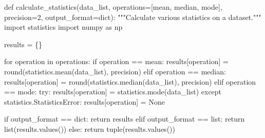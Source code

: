 \documentclass[
  letterpaper,
  DIV=11,
  numbers=noendperiod,
  oneside]{scrreprt}
\newenvironment{Shaded}{}{}
\newcommand{\BuiltInTok}[1]{\textcolor[rgb]{0.84,0.23,0.29}{#1}}
\newcommand{\CommentTok}[1]{\textcolor[rgb]{0.42,0.45,0.49}{#1}}
\newcommand{\ControlFlowTok}[1]{\textcolor[rgb]{0.84,0.23,0.29}{#1}}
\newcommand{\DecValTok}[1]{\textcolor[rgb]{0.00,0.36,0.77}{#1}}
\newcommand{\ImportTok}[1]{\textcolor[rgb]{0.01,0.18,0.38}{#1}}
\newcommand{\KeywordTok}[1]{\textcolor[rgb]{0.84,0.23,0.29}{#1}}
\newcommand{\NormalTok}[1]{\textcolor[rgb]{0.14,0.16,0.18}{#1}}
\newcommand{\OperatorTok}[1]{\textcolor[rgb]{0.14,0.16,0.18}{#1}}
\newcommand{\StringTok}[1]{\textcolor[rgb]{0.01,0.18,0.38}{#1}}
\newcommand{\VariableTok}[1]{\textcolor[rgb]{0.89,0.38,0.04}{#1}}
\begin{document}
\begin{Shaded}
\begin{Highlighting}[]
\KeywordTok{def}\NormalTok{ calculate\_statistics(data\_list, operations}\OperatorTok{=}\NormalTok{[}\StringTok{\textquotesingle{}mean\textquotesingle{}}\NormalTok{, }\StringTok{\textquotesingle{}median\textquotesingle{}}\NormalTok{, }\StringTok{\textquotesingle{}mode\textquotesingle{}}\NormalTok{], }
\NormalTok{                        precision}\OperatorTok{=}\DecValTok{2}\NormalTok{, output\_format}\OperatorTok{=}\StringTok{\textquotesingle{}dict\textquotesingle{}}\NormalTok{):}
    \CommentTok{"""Calculate various statistics on a dataset."""}
    \ImportTok{import}\NormalTok{ statistics}
    \ImportTok{import}\NormalTok{ numpy }\ImportTok{as}\NormalTok{ np}
    
\NormalTok{    results }\OperatorTok{=}\NormalTok{ \{\}}
    
    \ControlFlowTok{for}\NormalTok{ operation }\KeywordTok{in}\NormalTok{ operations:}
        \ControlFlowTok{if}\NormalTok{ operation }\OperatorTok{==} \StringTok{\textquotesingle{}mean\textquotesingle{}}\NormalTok{:}
\NormalTok{            results[operation] }\OperatorTok{=} \BuiltInTok{round}\NormalTok{(statistics.mean(data\_list), precision)}
        \ControlFlowTok{elif}\NormalTok{ operation }\OperatorTok{==} \StringTok{\textquotesingle{}median\textquotesingle{}}\NormalTok{:}
\NormalTok{            results[operation] }\OperatorTok{=} \BuiltInTok{round}\NormalTok{(statistics.median(data\_list), precision)}
        \ControlFlowTok{elif}\NormalTok{ operation }\OperatorTok{==} \StringTok{\textquotesingle{}mode\textquotesingle{}}\NormalTok{:}
            \ControlFlowTok{try}\NormalTok{:}
\NormalTok{                results[operation] }\OperatorTok{=}\NormalTok{ statistics.mode(data\_list)}
            \ControlFlowTok{except}\NormalTok{ statistics.StatisticsError:}
\NormalTok{                results[operation] }\OperatorTok{=} \VariableTok{None}
    
    \ControlFlowTok{if}\NormalTok{ output\_format }\OperatorTok{==} \StringTok{\textquotesingle{}dict\textquotesingle{}}\NormalTok{:}
        \ControlFlowTok{return}\NormalTok{ results}
    \ControlFlowTok{elif}\NormalTok{ output\_format }\OperatorTok{==} \StringTok{\textquotesingle{}list\textquotesingle{}}\NormalTok{:}
        \ControlFlowTok{return} \BuiltInTok{list}\NormalTok{(results.values())}
    \ControlFlowTok{else}\NormalTok{:}
        \ControlFlowTok{return} \BuiltInTok{tuple}\NormalTok{(results.values())}


\end{Highlighting}
\end{Shaded}
\end{document}
